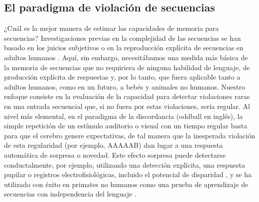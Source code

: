 \subsection{El paradigma de violación de secuencias}


¿Cuál es la mejor manera de estimar las capacidades de memoria para secuencias? Investigaciones previas en la complejidad de las secuencias se han basado en los juicios subjetivos o en la reproducción explícita de secuencias en adultos humanos \cite{f61}. Aquí, sin embargo, necesitábamos una medida más básica de la memoria de secuencias que no requiriera de ninguna habilidad de lenguaje, de producción explícita de respuestas y, por lo tanto, que fuera aplicable tanto a adultos humanos, como en un futuro, a bebés y animales no humanos. Nuestro enfoque consiste en la evaluación de la capacidad para detectar violaciones raras en una entrada secuencial que, si no fuera por estas violaciones, sería regular. Al nivel más elemental, en el paradigma de la discordancia (oddball en inglés), la simple repetición de un estímulo auditorio o visual con un tiempo regular basta para que el cerebro genere expectativas, de tal manera que la inesperada violación de esta regularidad (por ejemplo, AAAAAB) dan lugar a una respuesta automática de sorpresa o novedad. Este efecto sorpresa puede detectarse conductalmente, por ejemplo, utilizando una detección explícita, una respuesta pupilar o registros electrofisiológicas, incluido el potencial de disparidad \cite{f62,f63,f64}, y se ha utilizado con éxito en primates no humanos como una prueba de aprendizaje de secuencias con independencia del lenguaje \cite{f5,f65,f66}.

